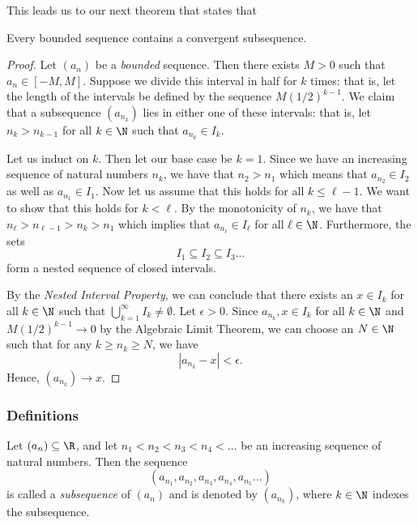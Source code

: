 This leads us to our next theorem that states that
\begin{tcolorbox}
    \begin{thm}
        Every bounded sequence contains a convergent subsequence.
\end{thm}
\end{tcolorbox}

\begin{proof}
    Let \( (a_n)\) be a \textit{bounded} sequence. Then there exists \( M > 0 \) such that \( a_n \in [-M,M ]\). Suppose we divide this interval in half for \( k \) times: that is, let the length of the intervals be defined by the sequence \( M (1/2)^{k-1}\). We claim that a subsequence \( (a_{n_k})\) lies in either one of these intervals: that is, let \( n_{k} > n_{k-1}\) for all \( k \in \N \) such that \( a_{n_k} \in I_k\). 

    Let us induct on \( k\). Then let our base case be \( k = 1 \). Since we have an increasing sequence of natural numbers \( n_k\), we have that \( n_2 > n_1 \) which means that \( a_{n_2} \in I_2\) as well as \( a_{n_1} \in I_1\). Now let us assume that this holds for all \( k \leq \ell - 1 \). We want to show that this holds for \( k < \ell \). By the monotonicity of \( n_k \), we have that \( n_{\ell} > n_{\ell - 1} > n_k > n_1\) which implies that \( a_{n_\ell} \in I_\ell\) for all \( \ell \in \N \). Furthermore, the sets 
    \[ I_1 \subseteq I_2 \subseteq I_3 ...\]
form a nested sequence of closed intervals.

    By the \textit{Nested Interval Property}, we can conclude that there exists an \( x \in I_k\) for all \( k \in \N \)  such that \( \bigcup_{k=1}^{ \infty} I_k \neq \emptyset\). Let \( \epsilon > 0  \). Since \( a_{n_k}, x \in I_k \) for all \( k \in \N \) and \( M (1/2)^{k-1} \to 0\) by the Algebraic Limit Theorem, we can choose an \( N \in \N \) such that for any \( k \geq n_k \geq N \), we have
    \[ |a_{n_k} - x | < \epsilon.\] 
    Hence, \( (a_{n_k}) \to x \).
\end{proof}



\subsubsection{Definitions}


\begin{tcolorbox}
\begin{defn}
Let \( (a_n) \subseteq \R \), and let \( n_1 < n_2 < n_3 < n_4 < \dots\) be an increasing sequence of natural numbers. Then the sequence 
\[ (a_{n_1}, a_{n_2}, a_{n_3}, a_{n_4}, a_{n_5} \dots)\]
is called a \textit{subsequence} of \( (a_n)\) and is denoted by \( (a_{n_k})\), where \( k \in \N \) indexes the subsequence.
\end{defn}
\end{tcolorbox} 


